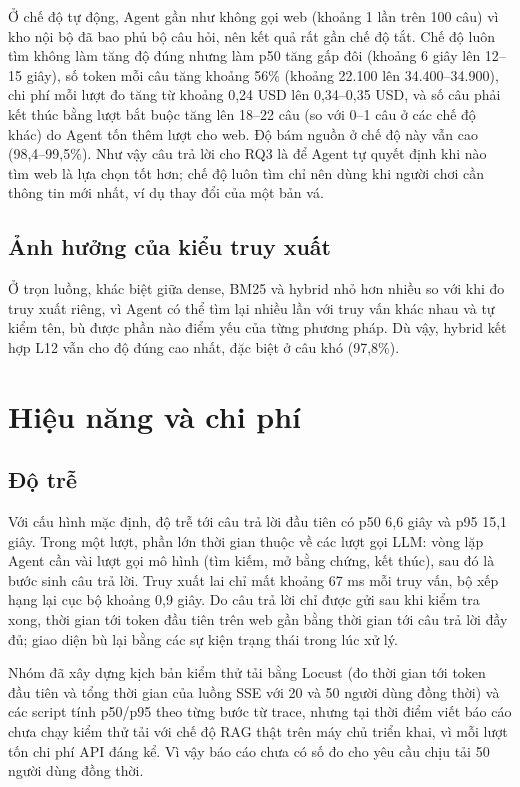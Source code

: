 Ở chế độ tự động, Agent gần như không gọi web (khoảng 1 lần trên 100 câu) vì kho nội bộ đã bao phủ bộ câu hỏi, nên kết quả rất gần chế độ tắt. Chế độ luôn tìm không làm tăng độ đúng nhưng làm p50 tăng gấp đôi (khoảng 6 giây lên 12--15 giây), số token mỗi câu tăng khoảng 56\% (khoảng 22.100 lên 34.400--34.900), chi phí mỗi lượt đo tăng từ khoảng 0,24 USD lên 0,34--0,35 USD, và số câu phải kết thúc bằng lượt  bắt buộc tăng lên 18--22 câu (so với 0--1 câu ở các chế độ khác) do Agent tốn thêm lượt cho web. Độ bám nguồn ở chế độ này vẫn cao (98,4--99,5\%). Như vậy câu trả lời cho RQ3 là để Agent tự quyết định khi nào tìm web là lựa chọn tốt hơn; chế độ luôn tìm chỉ nên dùng khi người chơi cần thông tin mới nhất, ví dụ thay đổi của một bản vá.

\subsection{Ảnh hưởng của kiểu truy xuất}
\label{sec:ablation_retrieval}

Ở trọn luồng, khác biệt giữa dense, BM25 và hybrid nhỏ hơn nhiều so với khi đo truy xuất riêng, vì Agent có thể tìm lại nhiều lần với truy vấn khác nhau và tự kiểm tên, bù được phần nào điểm yếu của từng phương pháp. Dù vậy, hybrid kết hợp L12 vẫn cho độ đúng cao nhất, đặc biệt ở câu khó (97,8\%).

\section{Hiệu năng và chi phí}
\label{sec:perf}

\subsection{Độ trễ}
\label{sec:latency}

Với cấu hình mặc định, độ trễ tới câu trả lời đầu tiên có p50 6,6 giây và p95 15,1 giây. Trong một lượt, phần lớn thời gian thuộc về các lượt gọi LLM: vòng lặp Agent cần vài lượt gọi mô hình (tìm kiếm, mở bằng chứng, kết thúc), sau đó là bước sinh câu trả lời. Truy xuất lai chỉ mất khoảng 67 ms mỗi truy vấn, bộ xếp hạng lại cục bộ khoảng 0,9 giây. Do câu trả lời chỉ được gửi sau khi kiểm tra xong, thời gian tới token đầu tiên trên web gần bằng thời gian tới câu trả lời đầy đủ; giao diện bù lại bằng các sự kiện trạng thái trong lúc xử lý.

Nhóm đã xây dựng kịch bản kiểm thử tải bằng Locust (đo thời gian tới token đầu tiên và tổng thời gian của luồng SSE với 20 và 50 người dùng đồng thời) và các script tính p50/p95 theo từng bước từ trace, nhưng tại thời điểm viết báo cáo chưa chạy kiểm thử tải với chế độ RAG thật trên máy chủ triển khai, vì mỗi lượt tốn chi phí API đáng kể. Vì vậy báo cáo chưa có số đo cho yêu cầu chịu tải 50 người dùng đồng thời.

